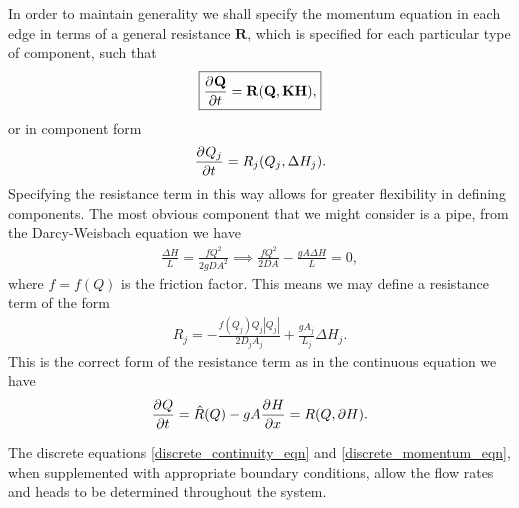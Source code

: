 In order to maintain generality we shall specify the momentum equation in each edge in terms of a general resistance $\mathbf{R}$, which is specified for each particular type of component, such that 
\begin{align}\label{discrete_momentum_eqn}
\boxed{\frac{\partial^{} \mathbf{Q}}{\partial t^{}}  = \mathbf{R}(\mathbf{Q}, \mathbf{K} \mathbf{H}),}
\end{align}
or in component form
\begin{align}
\frac{\partial^{} Q_j}{\partial t^{}} = R_j( Q_j, \Delta H_j ).
\end{align}
Specifying the resistance term in this way allows for greater flexibility in defining components. The most obvious component that we might consider is a pipe, from the Darcy-Weisbach equation we have
\begin{align}
\frac{\Delta H}{L} = \frac{f Q^2}{2 g D A^2} \implies \frac{f Q^2}{2 D A} - \frac{g A \Delta H}{L} = 0,
\end{align}
where $f = f(Q)$ is the friction factor. This means we may define a resistance term of the form
\begin{align}\label{pipe_resistance}
\boxed{ R_j = - \frac{f(Q_j)Q_j|Q_j|}{2 D_j A_j} + \frac{g A_j}{L_j} \Delta H_j. }
\end{align}
This is the correct form of the resistance term as in the continuous equation we have
\begin{align*}
\frac{\partial^{} Q}{\partial t^{}} = \hat{R}(Q) - g A \frac{\partial^{} H}{\partial x^{}} = R( Q, \partial H).
\end{align*}


The discrete equations \eqref{discrete_continuity_eqn} and \eqref{discrete_momentum_eqn}, when supplemented with appropriate boundary conditions, allow the flow rates and heads to be determined throughout the system. 
